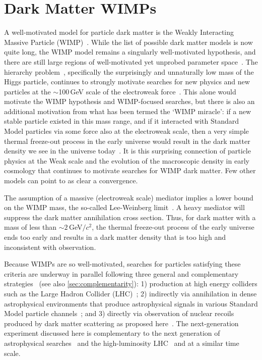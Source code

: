 \section{Dark Matter WIMPs}\label{sec:wimps}

A well-motivated model for particle dark matter is the Weakly Interacting Massive Particle (WIMP)~\cite{Jungman:1995df,Gelmini:2010zh}. While the list of possible dark matter models is now quite long, the WIMP model remains a singularly well-motivated hypothesis, and there are still large regions of well-motivated yet unprobed parameter space~\cite{Arcadi:2017kky}. The hierarchy problem~\cite{Witten:1981nf}, specifically the surprisingly and unnaturally low mass of the Higgs particle, continues to strongly motivate searches for new physics and new particles at the $\sim$100\,GeV scale of the electroweak force~\cite{Tanabashi:2018oca}. This alone would motivate the WIMP hypothesis and WIMP-focused searches, but there is also an additional motivation from what has been termed the `WIMP miracle': if a new stable particle existed in this mass range, and if it interacted with Standard Model particles via some force also at the electroweak scale, then a very simple thermal freeze-out process in the early universe would result in the dark matter density we see in the universe today~\cite{Bertone:2010zza,Steigman:2012nb}. It is this surprising connection of particle physics at the Weak scale and the evolution of the macroscopic density in early cosmology that continues to motivate searches for WIMP dark matter. Few other models can point to as clear a convergence.

The assumption of a massive (electroweak scale) mediator implies a lower bound on the WIMP mass, the so-called Lee-Weinberg limit~\cite{Kolb:1985nn}. A heavy mediator will suppress the dark matter annihilation cross section. Thus, for dark matter with a mass of less than $\sim2$\,GeV$/c^2$, the thermal freeze-out process of the early universe ends too early and results in a dark matter density that is too high and inconsistent with observation.

Because WIMPs are so well-motivated, searches for particles satisfying these criteria are underway in parallel following three general and complementary strategies~\cite{Roszkowski:2017nbc} (see also \autoref{sec:complementarity}): 1) production at high energy colliders such as the Large Hadron Collider (LHC)~\cite{Kahlhoefer:2017dnp}; 2) indirectly via annihilation in dense astrophysical environments that produce astrophysical signals in various Standard Model particle channels~\cite{Gaskins:2016cha}; and 3) directly via observation of nuclear recoils produced by dark matter scattering as proposed here~\cite{Undagoitia:2015gya}. The next-generation experiment discussed here is complementary to the next generation of astrophysical searches~\cite{Ong:2017ihp} and the high-luminosity LHC~\cite{Arduini:2016xsb} and at a similar time scale.

